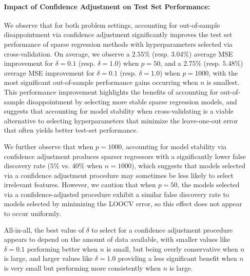 \documentclass[opre,nonblindrev]{informs3} %
\begin{document}
\paragraph{Impact of Confidence Adjustment on Test Set Performance: } We observe that for both problem settings, accounting for out-of-sample disappointment via confidence adjustment significantly improves the test set performance of sparse regression methods with hyperparameters selected via cross-validation. On average, we observe a $2.55\%$ (resp. $3.04\%$) average MSE improvement for $\delta=0.1$ (resp. $\delta=1.0$) when $p=50$, and a $2.75\%$ (resp. $5.48\%$) average MSE improvement for $\delta=0.1$ (resp. $\delta=1.0$) when $p=1000$, with the most significant out-of-sample performance gains occurring when $n$ is smallest. This performance improvement highlights the benefits of accounting for out-of-sample disappointment by selecting more stable sparse regression models, and suggests that accounting for model stability when cross-validating is a viable alternative to selecting hyperparameters that minimize the leave-one-out error that often yields better test-set performance. 

We further observe that when $p=1000$, accounting for model stability via confidence adjustment produces sparser regressors with a significantly lower false discovery rate ($5\%$ vs. $40\%$ when $n=1000$), which suggests that models selected via a confidence adjustment procedure may sometimes be less likely to select irrelevant features. However, we caution that when $p=50$, the models selected via a confidence-adjusted procedure exhibit a similar false discovery rate to models selected by minimizing the LOOCV error, so this effect does not appear to occur uniformly.

All-in-all, the best value of $\delta$ to select for a confidence adjustment procedure appears to depend on the amount of data available, with smaller values like $\delta=0.1$ performing better when $n$ is small, but being overly conservative when $n$ is large, and larger values like $\delta=1.0$ providing a less significant benefit when $n$ is very small but performing more consistently when $n$ is large. %
\end{document}
